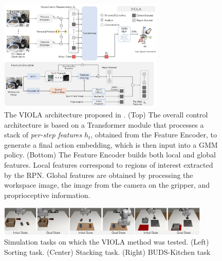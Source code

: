 \begin{figure}[t]
    \centering
    \includegraphics[width=0.7\textwidth]{figures/images/viola/viola_architecture.jpg}
        \caption{The VIOLA architecture proposed in \cite{zhu2023viola}. (Top) The overall control architecture is based on a Transformer module that processes a stack of \textit{per-step features} $h_{t}$, obtained from the Feature Encoder, to generate a final action embedding, which is then input into a GMM policy. (Bottom) The Feature Encoder builds both local and global features. Local features correspond to regions of interest extracted by the RPN. Global features are obtained by processing the workspace image, the image from the camera on the gripper, and proprioceptive information.
        }
    \label{fig:viola_architecture}
    
\end{figure}

\begin{figure}[t]
    \centering
    \includegraphics[width=0.9\textwidth]{figures/images/viola/viola_task.jpg}
    \caption{Simulation tasks on which the VIOLA \cite{zhu2023viola} method was tested. (Left) Sorting task. (Center) Stacking task. (Right) BUDS-Kitchen task}
    \label{fig:viola_task}
    
\end{figure}
